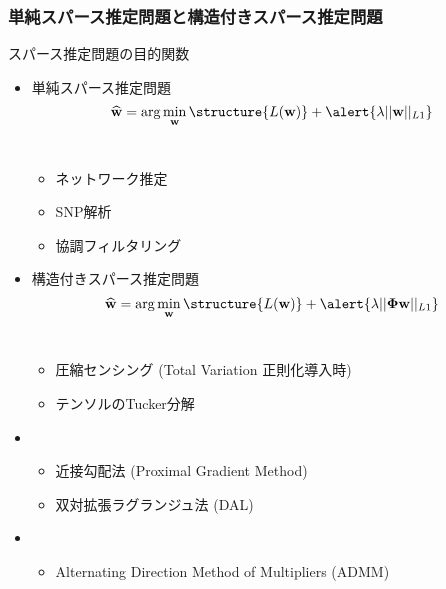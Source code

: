 \documentclass[9pt, dvipdfmx]{beamer}
\begin{document}
\begin{frame}
  \frametitle{単純スパース推定問題と構造付きスパース推定問題}
  \begin{block} {スパース推定問題の目的関数}
    \begin{itemize}
      \item 単純スパース推定問題\\[-3mm]
        \begin{equation*}
          \widehat{\bf w} = \arg\min_{\bf w} \structure{L({\bf w})} + \alert{\lambda ||{\bf w}||_{L1}}
        \end{equation*}\\[-3mm]
        \begin{itemize}
          \item ネットワーク推定
          \item SNP解析
          \item 協調フィルタリング
        \end{itemize}
      \item 構造付きスパース推定問題\\[-3mm]
        \begin{equation*}
          \widehat{\bf w} = \arg\min_{\bf w} \structure{L({\bf w})} + \alert{\lambda||{\bf \Phi w}||_{L1}}
        \end{equation*}\\[-3mm]
        \begin{itemize}
          \item 圧縮センシング (Total Variation 正則化導入時)
          \item テンソルのTucker分解
        \end{itemize}
    \end{itemize}
  \end{block}
  \begin{itemize}
    \item {}
      \begin{itemize}
        \item 近接勾配法 (Proximal Gradient Method)
        \item 双対拡張ラグランジュ法 (DAL)
      \end{itemize}
    \item {}
      \begin{itemize}
        \item Alternating Direction Method of Multipliers (ADMM)
      \end{itemize}
  \end{itemize}
\end{frame}
\end{document}

